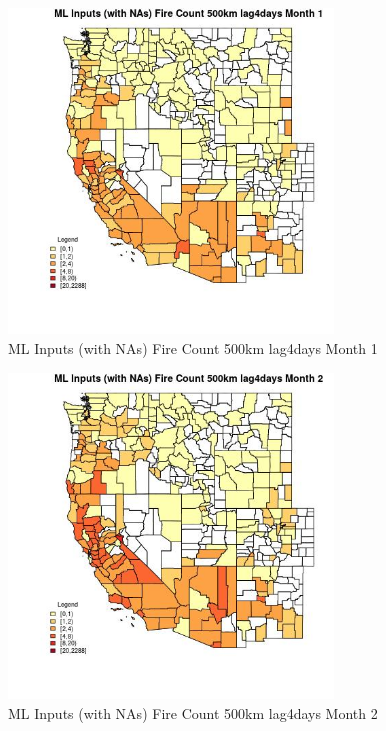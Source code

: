 \begin{figure} 
\centering  
\includegraphics[width=0.77\textwidth]{Code_Outputs/Report_ML_input_PM25_Step4_part_e_de_duplicated_aves_compiled_2019-05-20wNAs_CountyFire_Count_500km_lag4daysmedianMonth1.jpg} 
\caption{\label{fig:Report_ML_input_PM25_Step4_part_e_de_duplicated_aves_compiled_2019-05-20wNAsCountyFire_Count_500km_lag4daysmedianMonth1}ML Inputs (with NAs) Fire Count 500km lag4days Month 1} 
\end{figure} 
 

\begin{figure} 
\centering  
\includegraphics[width=0.77\textwidth]{Code_Outputs/Report_ML_input_PM25_Step4_part_e_de_duplicated_aves_compiled_2019-05-20wNAs_CountyFire_Count_500km_lag4daysmedianMonth2.jpg} 
\caption{\label{fig:Report_ML_input_PM25_Step4_part_e_de_duplicated_aves_compiled_2019-05-20wNAsCountyFire_Count_500km_lag4daysmedianMonth2}ML Inputs (with NAs) Fire Count 500km lag4days Month 2} 
\end{figure} 
 

